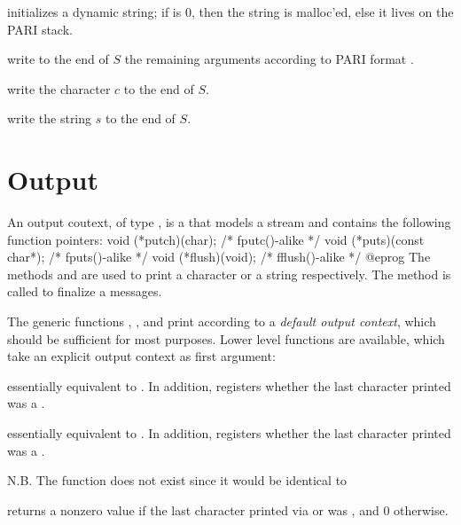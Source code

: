  initializes a dynamic
string; if  is 0, then the string is malloc'ed, else
it lives on the PARI stack.

 write to the end
of $S$ the remaining arguments according to PARI format .

 write the character $c$ to the end
of $S$.

 write the string $s$ to the
end of $S$.

\section{Output}


An output coutext, of type , is a 
that models a stream and contains the following function pointers:
\bprog
void (*putch)(char);           /* fputc()-alike */
void (*puts)(const char*);     /* fputs()-alike */
void (*flush)(void);           /* fflush()-alike */
@eprog\noindent
The methods  and  are used to print a character
or a string respectively.  The method  is called to finalize a
messages.

The generic functions , ,  and
 print according to a \emph{default output context}, which
should be sufficient for most purposes. Lower level functions are available,
which take an explicit output context as first argument:

 essentially equivalent to
. In addition, registers whether the last character printed
was a .

 essentially equivalent to
. In addition, registers whether the last character printed
was a .



\noindent N.B. The function  does not exist since it would be
identical to 

 returns a nonzero value if the last
character printed via  or  was , and $0$ otherwise.

